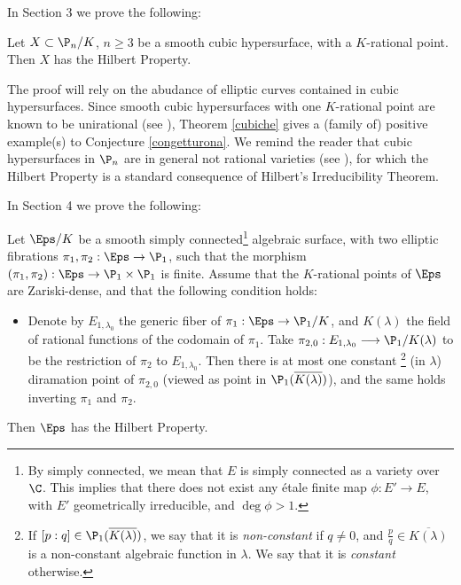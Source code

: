 In Section 3 we prove the following:
\begin{theorem}\label{cubiche}
	Let $X\subset \P_n/K$, $n \geq 3$ be a smooth cubic hypersurface, with a $K$-rational point. Then $X$ has the Hilbert Property.
\end{theorem}

The proof will rely on the abudance of elliptic curves contained in cubic hypersurfaces.
Since smooth cubic hypersurfaces with one $K$-rational point are known to be unirational (see \cite{unirationalcubics}), Theorem \ref{cubiche} gives a (family of) positive example(s) to Conjecture \ref{congetturona}. We remind the reader that cubic hypersurfaces in $\P_n$ are in general not rational varieties (see \cite{nonrationalcubics}), for which the Hilbert Property is a standard consequence of Hilbert's Irreducibility Theorem.


In Section 4 we prove the following:
\begin{theorem}\label{K3surfaces}
	Let $\Eps/K$ be a smooth simply connected\footnote{By simply connected, we mean that $E$ is simply connected as a variety over $\C$. This implies that there does not exist any étale finite map $\phi:E' \rightarrow E$, with $E'$ geometrically irreducible, and $\deg \phi >1$.} algebraic surface, with two elliptic fibrations $\pi_1,\pi_2:\Eps \rightarrow \P_1$, such that the morphism $(\pi_1,\pi_2):\Eps \rightarrow \P_1 \times \P_1$ is finite. Assume that the $K$-rational points of $\Eps$ are Zariski-dense, and that the following condition holds:
	\begin{itemize}\label{genericramificationtheorem}
		\item Denote by $E_{1,\lambda_0}$ the generic fiber of $\pi_1:\Eps \rightarrow \P_1/K$, and $K(\lambda)$ the field of rational functions of the codomain of $\pi_1$. Take $\pi_{2,0}:E_{1,\lambda_0}\longrightarrow \P_1/{K(\lambda)}$ to be the restriction of $\pi_2$ to $E_{1,\lambda_0}$. Then there is at most one constant	 \footnote{If $[p:q]\in \P_1(\overline{K(\lambda)})$, we say that it is \emph{non-constant} if $q \neq 0$, and $\frac{p}{q} \in \overline{K(\lambda)}$ is a non-constant algebraic function in $\lambda$. We say that it is \emph{constant} otherwise.} (in $\lambda$) diramation point of $\pi_{2,0}$ (viewed as point in $\P_1(\overline{{K(\lambda)}})$), and the same holds inverting $\pi_1$ and $\pi_2$.
		
	\end{itemize}
	Then $\Eps$ has the Hilbert Property.
\end{theorem}

